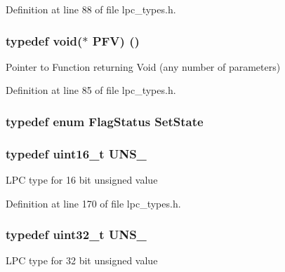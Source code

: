 Definition at line 88 of file lpc\+\_\+types.\+h.

\subsubsection[{\texorpdfstring{P\+FV}{PFV}}]{\setlength{\rightskip}{0pt plus 5cm}typedef void($\ast$ P\+FV) ()}\hypertarget{group__LPC__Types__Public__Types_ga5f7b826e88ffb1fae2260abb3a75b19a}{}\label{group__LPC__Types__Public__Types_ga5f7b826e88ffb1fae2260abb3a75b19a}
Pointer to Function returning Void (any number of parameters) 

Definition at line 85 of file lpc\+\_\+types.\+h.

\subsubsection[{\texorpdfstring{Set\+State}{SetState}}]{\setlength{\rightskip}{0pt plus 5cm}typedef  enum {\bf Flag\+Status}  {\bf Set\+State}}\hypertarget{group__LPC__Types__Public__Types_ga7fab312a9f10f1386a955977d2ec96fe}{}\label{group__LPC__Types__Public__Types_ga7fab312a9f10f1386a955977d2ec96fe}
\subsubsection[{\texorpdfstring{U\+N\+S\+\_\+16}{UNS_16}}]{\setlength{\rightskip}{0pt plus 5cm}typedef uint16\+\_\+t {\bf U\+N\+S\+\_}}\hypertarget{group__LPC__Types__Public__Types_gafce87a7f2271b2cf38d7532f157f8a50}{}\label{group__LPC__Types__Public__Types_gafce87a7f2271b2cf38d7532f157f8a50}
L\+PC type for 16 bit unsigned value 

Definition at line 170 of file lpc\+\_\+types.\+h.

\subsubsection[{\texorpdfstring{U\+N\+S\+\_\+32}{UNS_32}}]{\setlength{\rightskip}{0pt plus 5cm}typedef uint32\+\_\+t {\bf U\+N\+S\+\_}}\hypertarget{group__LPC__Types__Public__Types_ga28adf5c6b1811ca447826319598d8aba}{}\label{group__LPC__Types__Public__Types_ga28adf5c6b1811ca447826319598d8aba}
L\+PC type for 32 bit unsigned value 

